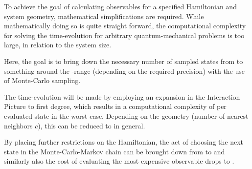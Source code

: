 To achieve the goal of calculating observables for a specified Hamiltonian and system geometry, mathematical simplifications are required. 
While mathematically doing so is quite straight forward, the computational complexity for solving the time-evolution for arbitrary quantum-mechanical problems is too large, in relation to the system size.

Here, the goal is to bring down the necessary number of sampled states from  to something around the -range (depending on the required precision) with the use of Monte-Carlo sampling. 

The time-evolution will be made by employing an expansion in the Interaction Picture to first degree, which results in a computational complexity of  per evaluated state in the worst case. 
Depending on the geometry (number of nearest neighbors $c$), this can be reduced to  in general.

By placing further restrictions on the Hamiltonian, the act of choosing the next state in the Monte-Carlo-Markov chain can be brought down from  to  and similarly also the cost of evaluating the most expensive observable drops to .